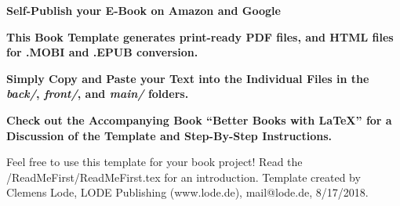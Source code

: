 

\thispagestyle{empty}

	\begin{center}

  \bfseries \sffamily \Huge Self-Publish your E-Book on Amazon and Google\par
	\bfseries \LARGE This Book Template generates print-ready PDF files, and HTML files for .MOBI and .EPUB conversion.\par
    \bfseries \LARGE Simply Copy and Paste your Text into the Individual Files in the \textit{back/}, \textit{front/}, and \textit{main/} folders.\par
    \bfseries \LARGE Check out the Accompanying Book ``Better Books with LaTeX'' for a Discussion of the Template and Step-By-Step Instructions.\par
    \Large Feel free to use this template for your book project! Read the /ReadMeFirst/ReadMeFirst.tex for an introduction. Template created by Clemens Lode, LODE Publishing (www.lode.de), mail@lode.de, 8/17/2018.
	\end{center}
\newpage
